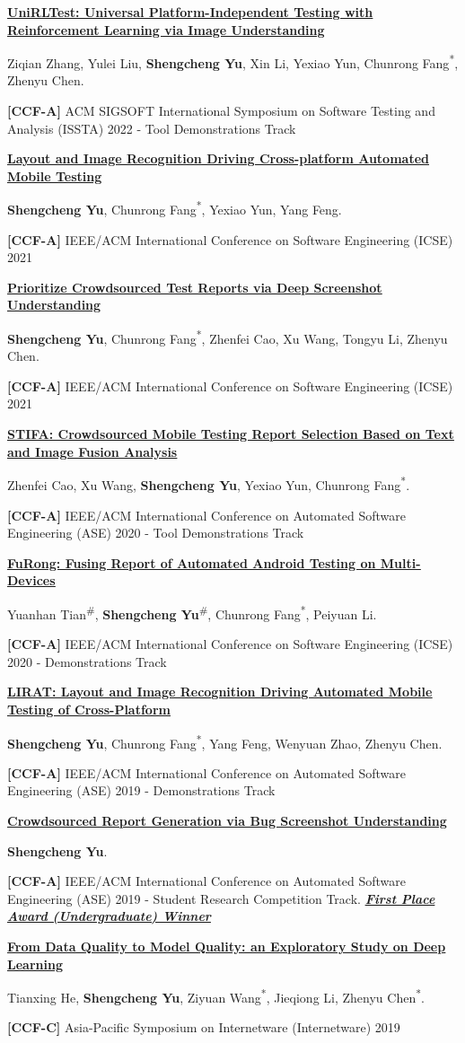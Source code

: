 \documentclass[12pt,a4paper]{article}
\newcommand{\me}{\textbf{Shengcheng Yu}}
\newcommand{\cofirst}{\textsuperscript{\#}}
\newcommand{\corr}{\textsuperscript{*}}
\newcommand{\ccf}[1]{\textbf{[#1]}}
\newcommand{\awardtag}[1]{\textbf{\textit{\uline{#1}}}}
\newcommand{\publication}[5]{%
  \begin{samepage}%
  \href{#5}{\textbf{\uline{#1}}}#2\par\nopagebreak[4]
  #3.\par\nopagebreak[4]
  #4\par
  \end{samepage}%
  \vspace{4.8pt}%
}
\begin{document}
\publication
{UniRLTest: Universal Platform-Independent Testing with Reinforcement Learning via Image Understanding}
{}
{Ziqian Zhang, Yulei Liu, \me, Xin Li, Yexiao Yun, Chunrong Fang\corr, Zhenyu Chen}
{\ccf{CCF-A} ACM SIGSOFT International Symposium on Software Testing and Analysis (ISSTA) 2022 - Tool Demonstrations Track}
{https://doi.org/10.1145/3533767.3543292}

\publication
{Layout and Image Recognition Driving Cross-platform Automated Mobile Testing}
{}
{\me, Chunrong Fang\corr, Yexiao Yun, Yang Feng}
{\ccf{CCF-A} IEEE/ACM International Conference on Software Engineering (ICSE) 2021}
{https://doi.org/10.1109/ICSE43902.2021.00139}

\publication
{Prioritize Crowdsourced Test Reports via Deep Screenshot Understanding}
{}
{\me, Chunrong Fang\corr, Zhenfei Cao, Xu Wang, Tongyu Li, Zhenyu Chen}
{\ccf{CCF-A} IEEE/ACM International Conference on Software Engineering (ICSE) 2021}
{https://doi.org/10.1109/ICSE43902.2021.00090}

\publication
{STIFA: Crowdsourced Mobile Testing Report Selection Based on Text and Image Fusion Analysis}
{}
{Zhenfei Cao, Xu Wang, \me, Yexiao Yun, Chunrong Fang\corr}
{\ccf{CCF-A} IEEE/ACM International Conference on Automated Software Engineering (ASE) 2020 - Tool Demonstrations Track}
{https://doi.org/10.1145/3324884.3415300}

\publication
{FuRong: Fusing Report of Automated Android Testing on Multi-Devices}
{}
{Yuanhan Tian\cofirst, \me\cofirst, Chunrong Fang\corr, Peiyuan Li}
{\ccf{CCF-A} IEEE/ACM International Conference on Software Engineering (ICSE) 2020 - Demonstrations Track}
{https://doi.org/10.1145/3377812.3382138}

\publication
{LIRAT: Layout and Image Recognition Driving Automated Mobile Testing of Cross-Platform}
{}
{\me, Chunrong Fang\corr, Yang Feng, Wenyuan Zhao, Zhenyu Chen}
{\ccf{CCF-A} IEEE/ACM International Conference on Automated Software Engineering (ASE) 2019 - Demonstrations Track}
{https://doi.org/10.1109/ASE.2019.00103}

\publication
{Crowdsourced Report Generation via Bug Screenshot Understanding}
{}
{\me}
{\ccf{CCF-A} IEEE/ACM International Conference on Automated Software Engineering (ASE) 2019 - Student Research Competition Track. \awardtag{First Place Award (Undergraduate) Winner}}
{https://doi.org/10.1109/ASE.2019.00161}

\publication
{From Data Quality to Model Quality: an Exploratory Study on Deep Learning}
{}
{Tianxing He, \me, Ziyuan Wang\corr, Jieqiong Li, Zhenyu Chen\corr}
{\ccf{CCF-C} Asia-Pacific Symposium on Internetware (Internetware) 2019}
{https://doi.org/10.1145/3361242.3361260}
\end{document}
